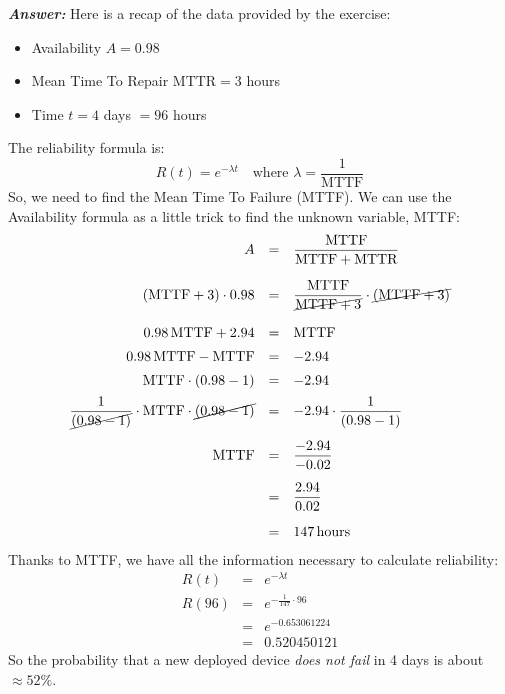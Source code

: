 \begin{enumerate}
    \textcolor{Green3}{\textbf{\emph{Answer:}}} Here is a recap of the data provided by the exercise:
    \begin{itemize}
        \item Availability $A = 0.98$
        \item Mean Time To Repair $\text{MTTR} = 3$ hours
        \item Time $t = 4$ days $= 96$ hours
    \end{itemize}
    The reliability formula is:
    \begin{equation*}
        R\left(t\right) = e^{-\lambda t} \quad \text{where } \lambda = \dfrac{1}{\text{MTTF}}
    \end{equation*}
    So, we need to find the Mean Time To Failure (MTTF). We can use the Availability formula as a little trick to find the unknown variable, MTTF:
    \begin{equation*}
        \begin{array}{rcl}
            A &=& \dfrac{\text{MTTF}}{\text{MTTF} + \text{MTTR}} \\ [1.5em]
            \left(\text{MTTF} + 3\right) \cdot 0.98 &=& \dfrac{\text{MTTF}}{\cancel{\text{MTTF} + 3}} \cdot \cancel{\left(\text{MTTF} + 3\right)} \\ [1.5em]
            0.98 \, \text{MTTF} + 2.94 &=& \text{MTTF} \\ [.5em]
            0.98 \, \text{MTTF} - \text{MTTF} &=& - 2.94 \\ [.5em]
            \text{MTTF} \cdot \left(0.98-1\right) &=& - 2.94 \\ [.5em]
            \dfrac{1}{\cancel{\left(0.98-1\right)}} \cdot \text{MTTF} \cdot \cancel{\left(0.98-1\right)} &=& - 2.94 \cdot \dfrac{1}{\left(0.98-1\right)} \\ [1.5em]
            \text{MTTF} &=& \dfrac{-2.94}{-0.02} \\ [1.3em]
            &=& \dfrac{2.94}{0.02} \\ [1.3em]
            &=& 147 \, \text{hours}
        \end{array}
    \end{equation*}
    Thanks to MTTF, we have all the information necessary to calculate reliability:
    \begin{equation*}
        \begin{array}{rcl}
            R\left(t\right) &=& e^{-\lambda t} \\ [1em]
            R\left(96\right) &=& e^{-\frac{1}{147} \cdot 96} \\ [1em]
            &=& e^{-0.653061224} \\ [1em]
            &=& \mathbf{0.52}0450121
        \end{array}
    \end{equation*}
    So the probability that a new deployed device \emph{does not fail} in 4 days is about $\approx 52\%$.


\end{enumerate}
